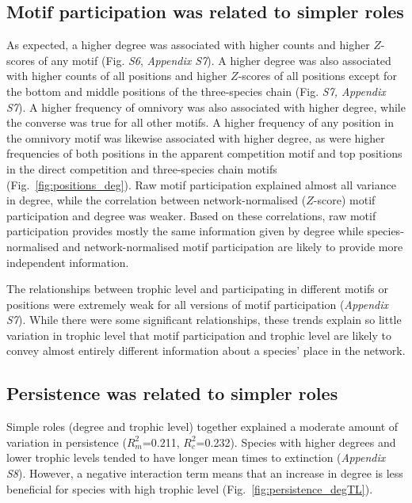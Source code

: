 \documentclass[12pt]{article}
\begin{document}
\begin{spacing}{2.0}
    \subsection*{Motif participation was related to simpler roles}    
    
        As expected, a higher degree was associated with higher counts and higher $Z$-scores of any motif (Fig. \emph{S6}, \emph{Appendix S7}).
        A higher degree was also associated with higher counts of all positions and higher $Z$-scores of all positions except for the bottom and middle positions of the three-species chain (Fig. \emph{S7, Appendix S7}).
        A higher frequency of omnivory was also associated with higher degree, while the converse was true for all other motifs.
        A higher frequency of any position in the omnivory motif was likewise associated with higher degree, as were higher frequencies of both positions in the apparent competition motif and top positions in the direct competition and three-species chain motifs (Fig.~\ref{fig:positions_deg}).
        Raw motif participation explained almost all variance in degree, while the correlation between network-normalised ($Z$-score) motif participation and degree was weaker.
        Based on these correlations, raw motif participation provides mostly the same information given by degree while species-normalised and network-normalised motif participation are likely to provide more independent information.
        
    
        The relationships between trophic level and participating in different motifs or positions were extremely weak for all versions of motif participation (\emph{Appendix S7}).
        While there were some significant relationships, these trends explain so little variation in trophic level that motif participation and trophic level are likely to convey almost entirely different information about a species' place in the network.
    

    \subsection*{Persistence was related to simpler roles}
    
        Simple roles (degree and trophic level) together explained a moderate amount of variation in persistence ($R^2_m$=0.211, $R^2_c$=0.232).
        Species with higher degrees and lower trophic levels tended to have longer mean times to extinction (\emph{Appendix S8}).
        However, a negative interaction term means that an increase in degree is less beneficial for species with high trophic level (Fig.~\ref{fig:persistence_degTL}).
    

\end{spacing}
\end{document}
